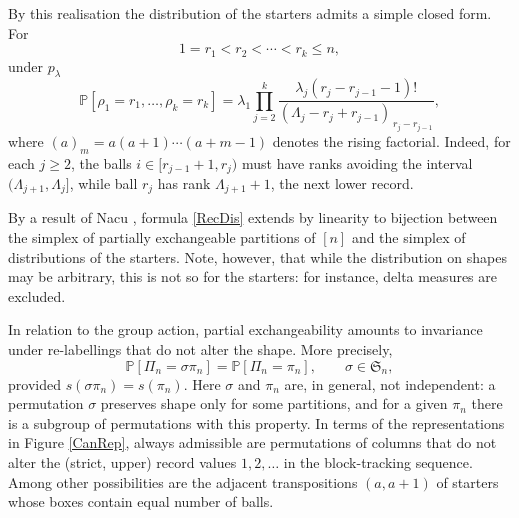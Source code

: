 \documentclass{article}
\begin{document}
By this realisation the distribution of the starters admits a simple closed form.
For
\[
1=r_1<r_2<\cdots<r_k\le n,
\]
under $p_\lambda$
\begin{equation}\label{RecDis}
\mathbb P[\rho_1=r_1,\ldots,\rho_k=r_k]
=
\lambda_1
\prod_{j=2}^{k}
\frac{\lambda_j(r_j-r_{j-1}-1)!}
     {(\Lambda_j-r_j+r_{j-1})_{\,r_j-r_{j-1}}},
\end{equation}
where
$(a)_m=a(a+1)\cdots(a+m-1)$
denotes the rising factorial.
Indeed, for each $j\ge2$, the balls
$i\in[r_{j-1}+1,r_j)$
must have ranks avoiding the interval
$(\Lambda_{j+1},\Lambda_j]$,
while ball $r_j$ has rank $\Lambda_{j+1}+1$, the next lower record.


By a result of Nacu \cite{Nacu}, formula \eqref{RecDis} extends by linearity to 
bijection between the simplex of partially exchangeable partitions of $[n]$
and the simplex of distributions of the starters. Note, however, that while
the distribution on shapes may be arbitrary, this is not so for the starters:
for instance, delta measures are excluded.













In relation to the group action, partial exchangeability amounts to invariance under re-labellings that do not alter the shape. More precisely,
\[
{\mathbb P }[\Pi_n=\sigma\pi_n]={\mathbb P }[\Pi_n=\pi_n], \qquad \sigma\in{\mathfrak S}_n,
\]
provided
$s(\sigma\pi_n)=s(\pi_n).$
Here $\sigma$ and $\pi_n$ are, in general, not independent: a permutation $\sigma$ preserves shape only for some partitions, and for a given $\pi_n$ there is a subgroup of permutations with this property.
In terms of the representations in Figure \ref{CanRep}, always admissible are permutations of columns that do not alter the (strict, upper) record values $1,2,\ldots$ in the block-tracking sequence.
Among other possibilities are the adjacent transpositions $(a, a+1)$ of starters whose boxes contain equal number of balls.















\end{document}
